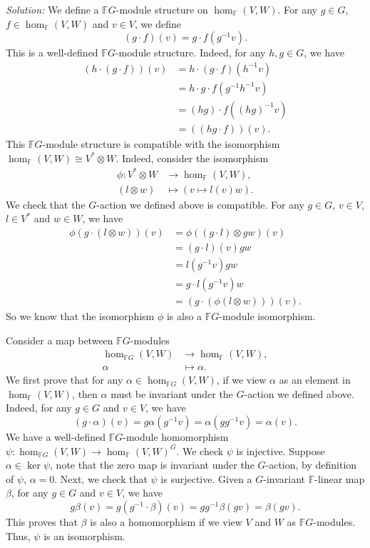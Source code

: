 \documentclass[a4paper, 12pt]{article}
\newenvironment{solution}
    {\textit{Solution:}}
    {}
\begin{document}
\begin{solution}
We define a \(\mathbb{F}G\)-module structure on \(\hom_\mathbb{F}(V,W)\). For any \(g\in G\), \(f\in \hom_\mathbb{F}(V,W)\) and \(v\in V\), we define 
\[(g\cdot f)(v)=g\cdot f(g^{-1}v).\]
This is a well-defined \(\mathbb{F}G\)-module structure. Indeed, for any \(h,g\in G\), we have 
\begin{align*}
	(h\cdot (g\cdot f))(v)&=h\cdot (g\cdot f)(h^{-1}v)\\ 
	                      &=h\cdot g\cdot f(g^{-1}h^{-1}v)\\ 
						  &=(hg)\cdot f((hg)^{-1}v)\\ 
						  &=((hg\cdot f))(v).
\end{align*}
This \(\mathbb{F}G\)-module structure is compatible with the isomorphism \(\hom_\mathbb{F}(V,W)\cong V^*\otimes W\). Indeed, consider the isomorphism 
\begin{align*}
	\phi:V^*\otimes W&\rightarrow \hom_\mathbb{F}(V,W),\\ 
	  (l\otimes w)&\mapsto (v\mapsto l(v)w).
\end{align*}
We check that the \(G\)-action we defined above is compatible. For any \(g\in G\), \(v\in V\), \(l\in V^*\) and \(w\in W\), we have 
\begin{align*}
	\phi(g\cdot (l\otimes w))(v)&=\phi((g\cdot l)\otimes gw)(v)\\ 
	                            &=(g\cdot l)(v)gw\\ 
								&=l(g^{-1}v)gw\\ 
								&=g\cdot l(g^{-1}v)w\\ 
								&=(g\cdot (\phi(l\otimes w)))(v).
\end{align*}
So we know that the isomorphism \(\phi\) is also a \(\mathbb{F}G\)-module isomorphism. 

Consider a map between \(\mathbb{F}G\)-modules 
\begin{align*}
	\hom_{\mathbb{F}G}(V,W)&\rightarrow \hom_\mathbb{F}(V,W),\\ 
	\alpha&\mapsto \alpha.
\end{align*}
We first prove that for any \(\alpha\in \hom_{\mathbb{F}G}(V,W)\), if we view \(\alpha\) as an element in \(\hom_\mathbb{F}(V,W)\), then \(\alpha\) must be invariant under the \(G\)-action we defined above. Indeed, for 
any \(g\in G\) and \(v\in V\), we have 
\[(g\cdot \alpha)(v)=g\alpha(g^{-1}v)=\alpha(gg^{-1}v)=\alpha(v).\]
We have a well-defined \(\mathbb{F}G\)-module homomorphism \(\psi:\hom_{\mathbb{F}G}(V,W)\rightarrow \hom_\mathbb{F}(V,W)^G\). We check \(\psi\) is injective. Suppose 
\(\alpha\in \ker \psi\), note that the zero map is invariant under the \(G\)-action, by definition of \(\psi\), \(\alpha=0\). Next, we check that \(\psi\) is surjective. Given a \(G\)-invariant \(\mathbb{F}\)-linear map \(\beta\), for any \(g\in G\) and \(v\in V\), we have 
\[g\beta(v)=g(g^{-1}\cdot \beta)(v)=gg^{-1}\beta(gv)=\beta(gv).\]
This proves that \(\beta\) is also a homomorphism if we view \(V\) and \(W\) as \(\mathbb{F}G\)-modules. Thus, \(\psi\) is an isomorphism. 
\end{solution}
\end{document}
